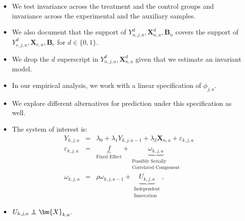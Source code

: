 \documentclass[static]{JJH-Beamer}
\newcommand\independent{\protect\mathpalette{\protect\independenT}{\perp}}
\def\independenT#1#2{\mathrel{\rlap{$#1#2$}\mkern2mu{#1#2}}}
\begin{document}
\begin{frame}
 \addtocounter{framenumber}{-1}

\begin{itemize}
\item We test invariance across the treatment and the control groups and invariance across the experimental and the auxiliary samples.
\item We also document that the support of $Y_{n,j,a}^d, \bm{X}_{n,a}^d, \bm{B}_{n}$ covers the support of $Y_{e,j,a}^d, \bm{X}_{e,a}, \bm{B}_{e}$ for $d \in \{0, 1\}$.
\item We drop the $d$ superscript in $Y_{n,j,a}^d, \bm{X}_{n,a}^d$ given that we estimate an invariant model.
\end{itemize}

\end{frame}

\begin{frame}
 \addtocounter{framenumber}{-1}

\begin{itemize}
\item In our empirical analysis, we work with a linear specification of $\phi_{j,a}$.
\item We explore different alternatives for prediction under this specification as well.
\item The system of interest is:
    \begin{eqnarray}
    Y_{k,j,a}  &=& \lambda_{0} + \lambda_{1} Y_{k,j,a-1} + \lambda_{2}  \bm{X}_{n,a} + \varepsilon_{k,j,a} \nonumber \\
    \varepsilon_{k,j,a} &=& \underbrace{f}_{\text{Fixed Effect}} + \underbrace{\omega_{k,j,a}}_{\substack{\text{Possibly Serially}\\ \text{Correlated Component}}} \nonumber \\
    \omega_{k,j,a}      &=& \rho \omega_{k,j,a-1} + \underbrace{U_{k,j,a}}_{\substack{\text{Independent}\\ \text{Innovation}}},
    \end{eqnarray}
\item $U_{k,j,a} \independent \bm{X}_{k,a}$.
\end{itemize}

\end{frame}
\end{document}
